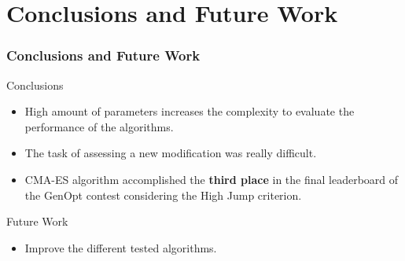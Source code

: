 \section{Conclusions and Future Work}
\begin{frame}
\frametitle{Conclusions and Future Work}
\begin{block}{Conclusions}
\begin{itemize}
	\item High amount of parameters increases the complexity to evaluate the performance of the algorithms.
	\item The task of assessing a new modification was really difficult.
	\item CMA-ES algorithm accomplished the \textbf{third place} in the final leaderboard of the GenOpt contest considering the High Jump criterion.
\end{itemize}
\end{block}
\begin{block}{Future Work}
\begin{itemize}
	\item Improve the different tested algorithms.
\end{itemize}
\end{block}
\end{frame}